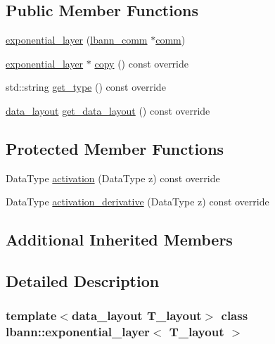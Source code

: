 \subsection*{Public Member Functions}
\begin{DoxyCompactItemize}
\item 
\hyperlink{classlbann_1_1exponential__layer_a1a0d4f1be9f58235782f04c215589360}{exponential\+\_\+layer} (\hyperlink{classlbann_1_1lbann__comm}{lbann\+\_\+comm} $\ast$\hyperlink{file__io_8cpp_ab048c6f9fcbcfaa57ce68b00263dbebe}{comm})
\item 
\hyperlink{classlbann_1_1exponential__layer}{exponential\+\_\+layer} $\ast$ \hyperlink{classlbann_1_1exponential__layer_ac1f8c1e00ceddeb059f9ee6dd77052af}{copy} () const override
\item 
std\+::string \hyperlink{classlbann_1_1exponential__layer_a1af0f57aab2940d09bd1f0ba671fc171}{get\+\_\+type} () const override
\item 
\hyperlink{base_8hpp_a786677cbfb3f5677b4d84f3056eb08db}{data\+\_\+layout} \hyperlink{classlbann_1_1exponential__layer_a0752622c055391421c4916bb02eda923}{get\+\_\+data\+\_\+layout} () const override
\end{DoxyCompactItemize}
\subsection*{Protected Member Functions}
\begin{DoxyCompactItemize}
\item 
Data\+Type \hyperlink{classlbann_1_1exponential__layer_a7e1a5b088bb129b065dd01438e6604af}{activation} (Data\+Type z) const override
\item 
Data\+Type \hyperlink{classlbann_1_1exponential__layer_a5d432d9bd73c02e2a22d313c9d2dfcd7}{activation\+\_\+derivative} (Data\+Type z) const override
\end{DoxyCompactItemize}
\subsection*{Additional Inherited Members}


\subsection{Detailed Description}
\subsubsection*{template$<$data\+\_\+layout T\+\_\+layout$>$\newline
class lbann\+::exponential\+\_\+layer$<$ T\+\_\+layout $>$}

